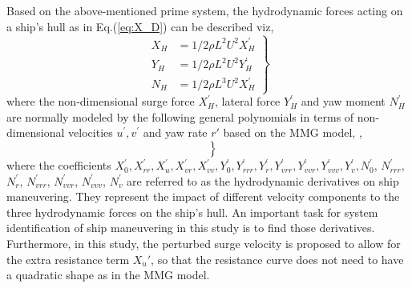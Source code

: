 \noindent Based on the above-mentioned prime system, the hydrodynamic forces acting on a ship's hull as in Eq.(\ref{eq:X_D}) can be described viz,
\begin{equation}
    \label{eq:XYN_H}
    \left.\begin{aligned}
    X_H & = 1/2\rho L^{2} U^{2} X_H^{'}  \\
    Y_H & = 1/2\rho L^{2} U^{2} Y_H^{'}  \\
    N_H & = 1/2\rho L^{3} U^{2} X_H^{'}
    \end{aligned}\right\}
\end{equation}
where the non-dimensional surge force $X_H^{'}$, lateral force $Y_H^{'}$ and yaw moment $N_H^{'}$ are normally modeled by the following general polynomials in terms of non-dimensional velocities $u^{'}, v^{'}$ and yaw rate $r'$ based on the MMG model, \citep{yasukawaIntroductionMMGStandard2015},
\begin{equation}
    \label{eq:XYN_H_prime}
    \left.\begin{aligned}
     \\
     \\
    
    \end{aligned}\right\}
\end{equation}
where the coefficients $X_0^{'}, X_{rr}^{'}, X_u^{'}, X_{vr}^{'}, X_{vv}^{'}, Y_{0}^{'}, Y_{rrr}^{'}, Y_{r}^{'}, Y_{vrr}^{'}, Y_{vvr}^{'}, Y_{vvv}^{'}, Y_{v}^{'}, N_{0}^{'}$, $N_{rrr}^{'}$, $N_{r}^{'}$, $N_{vrr}^{'}$, $N_{vvr}^{'}$, $N_{vvv}^{'}$, $N_{v}^{'}$ are referred to as the hydrodynamic derivatives on ship maneuvering. They represent the impact of different velocity components to the three hydrodynamic forces on the ship's hull. An important task for system identification of ship maneuvering in this study is to find those derivatives. Furthermore, in this study, the perturbed surge velocity is proposed to allow for the extra resistance term ${X_u}'$, so that the resistance curve does not need to have a quadratic shape as in the MMG model.  
%
%     
%     
